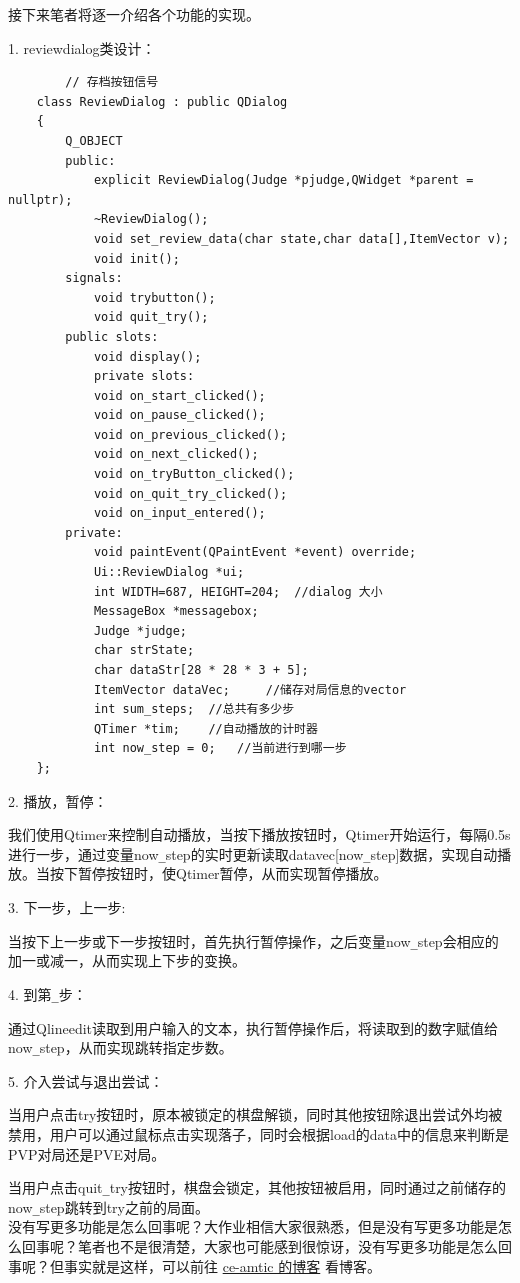 \documentclass{noithesis}
\begin{document}
    \newpage
    
    接下来笔者将逐一介绍各个功能的实现。
    
    1. reviewdialog类设计：
    \begin{lstlisting}
    	// 存档按钮信号
	class ReviewDialog : public QDialog
	{
		Q_OBJECT
		public:
			explicit ReviewDialog(Judge *pjudge,QWidget *parent = nullptr);
			~ReviewDialog();
			void set_review_data(char state,char data[],ItemVector v);
			void init();
		signals:
			void trybutton(); 
			void quit_try();
		public slots:
			void display();    
			private slots:
			void on_start_clicked();	
			void on_pause_clicked();
			void on_previous_clicked();
			void on_next_clicked();
			void on_tryButton_clicked();
			void on_quit_try_clicked();
			void on_input_entered();
		private:
			void paintEvent(QPaintEvent *event) override;
			Ui::ReviewDialog *ui;
			int WIDTH=687, HEIGHT=204;  //dialog 大小
			MessageBox *messagebox;
			Judge *judge;
			char strState; 
			char dataStr[28 * 28 * 3 + 5];
			ItemVector dataVec;		//储存对局信息的vector
			int sum_steps;  //总共有多少步
			QTimer *tim;    //自动播放的计时器
			int now_step = 0;   //当前进行到哪一步
	};
    \end{lstlisting}
    
    
    2. 播放，暂停：
    
    我们使用Qtimer来控制自动播放，当按下播放按钮时，Qtimer开始运行，每隔0.5s进行一步，通过变量now\verb|_|step的实时更新读取datavec[now\verb|_|step]数据，实现自动播放。当按下暂停按钮时，使Qtimer暂停，从而实现暂停播放。
    
	3. 下一步，上一步:
	
	当按下上一步或下一步按钮时，首先执行暂停操作，之后变量now\verb|_|step会相应的加一或减一，从而实现上下步的变换。

	4. 到第\verb|_|步：
	
	通过Qlineedit读取到用户输入的文本，执行暂停操作后，将读取到的数字赋值给now\verb|_|step，从而实现跳转指定步数。
	
	5. 介入尝试与退出尝试：
	
	当用户点击try按钮时，原本被锁定的棋盘解锁，同时其他按钮除退出尝试外均被禁用，用户可以通过鼠标点击实现落子，同时会根据load的data中的信息来判断是PVP对局还是PVE对局。
	
	当用户点击quit\verb|_|try按钮时，棋盘会锁定，其他按钮被启用，同时通过之前储存的now\verb|_|step跳转到try之前的局面。
	\\
	
	
	没有写更多功能是怎么回事呢？大作业相信大家很熟悉，但是没有写更多功能是怎么回事呢？笔者也不是很清楚，大家也可能感到很惊讶，没有写更多功能是怎么回事呢？但事实就是这样，可以前往 \href{https://ce-amtic.github.io/}{ce-amtic 的博客} 看博客。
	
\end{document}
